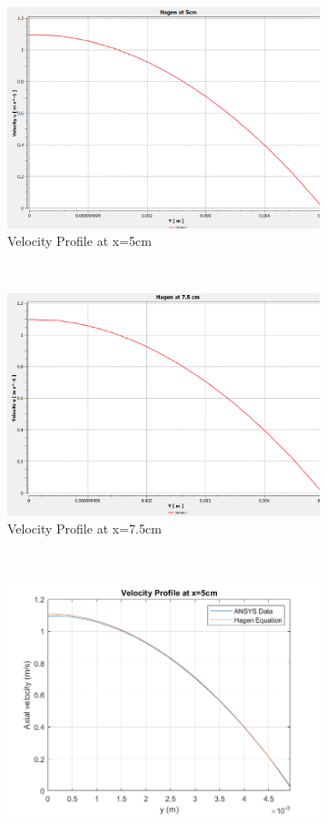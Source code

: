 \begin{figure}[H]
 \centering
\begin{subfigure}{.5\textwidth}
  \centering
  \includegraphics[width=.9\linewidth]{images/task1/hagen5.png}
  \caption{Velocity Profile at x=5cm}
  \label{fig:velprof5cm}
\end{subfigure}%
~
\begin{subfigure}{.5\textwidth}
  \centering
  \includegraphics[width=.9\linewidth]{images/task1/hagen75.png}
  \caption{Velocity Profile at x=7.5cm}
  \label{fig:velprof75cm}
\end{subfigure}
~
\begin{subfigure}{.45\textwidth}
  \centering
  \includegraphics[width=.9\linewidth]{images/task1/hagen_ansys.png}

\end{subfigure}
\end{figure}
